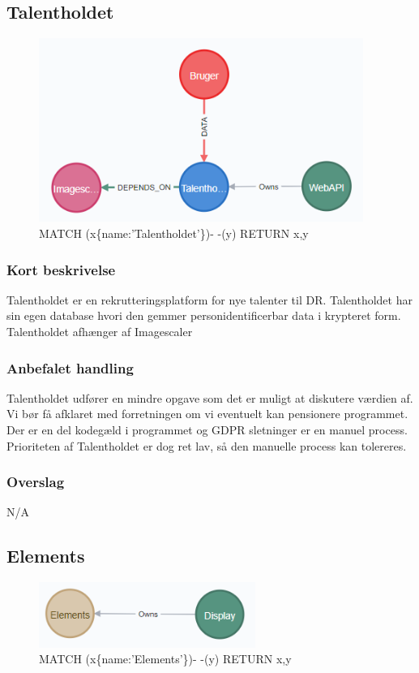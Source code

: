 \documentclass{article}
\begin{document}
\subsection{Talentholdet}
\begin{figure}[h]
\includegraphics[width=300pt]{Talentholdet.PNG}
\caption{MATCH (x\{name:'Talentholdet'\})- -(y) RETURN x,y}
\end{figure}
\subsubsection{Kort beskrivelse}
Talentholdet er en rekrutteringsplatform for nye talenter til DR. Talentholdet har sin egen database hvori den gemmer personidentificerbar data i krypteret form. Talentholdet afhænger af Imagescaler
\subsubsection{Anbefalet handling}
Talentholdet udfører en mindre opgave som det er muligt at diskutere værdien af. Vi bør få afklaret med forretningen om vi eventuelt kan pensionere programmet. Der er en del kodegæld i programmet og GDPR sletninger er en manuel process.
Prioriteten af Talentholdet er dog ret lav, så den manuelle process kan tolereres.
\subsubsection{Overslag}
N/A

\subsection{Elements}
\begin{figure}[h]
\includegraphics[width=200pt]{Elements.PNG}
\caption{MATCH (x\{name:'Elements'\})- -(y) RETURN x,y}
\end{figure}
\end{document}

